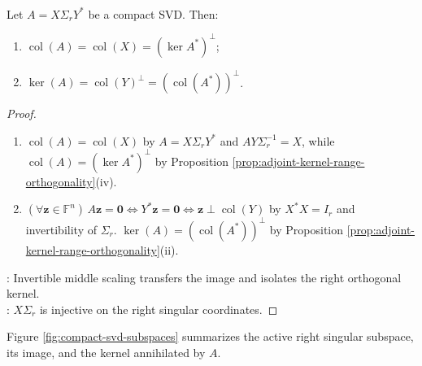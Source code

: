 \begin{theorem} \label{thm:compact-svd-subspaces} \\
Let $A=X\Sigma_rY^*$ be a compact SVD. Then:
\begin{enumerate}[label=(\roman*)]
\setlength{\itemsep}{0pt}
\item $\operatorname{col}(A)=\operatorname{col}(X)=(\ker A^*)^{\perp}$;
\item $\ker(A)=\operatorname{col}(Y)^{\perp}=(\operatorname{col}(A^*))^{\perp}$.
\end{enumerate}
\begin{proof}
\begin{enumerate}[label=(\roman*)]
\setlength{\itemsep}{0pt}
\item $\operatorname{col}(A)=\operatorname{col}(X)$ by $A=X\Sigma_rY^*$ and $AY\Sigma_r^{-1}=X$, while $\operatorname{col}(A)=(\ker A^*)^\perp$ by Proposition \ref{prop:adjoint-kernel-range-orthogonality}(iv).
\item $(\forall\mathbf{z}\in\mathbb{F}^n)\,A\mathbf{z}=\mathbf{0}\Longleftrightarrow Y^*\mathbf{z}=\mathbf{0}\Longleftrightarrow\mathbf{z}\perp\operatorname{col}(Y)$ by $X^*X=I_r$ and invertibility of $\Sigma_r$. $\ker(A)=(\operatorname{col}(A^*))^\perp$ by Proposition \ref{prop:adjoint-kernel-range-orthogonality}(ii).
\end{enumerate}
: Invertible middle scaling transfers the image and isolates the right orthogonal kernel.\\
: $X\Sigma_r$ is injective on the right singular coordinates.
\end{proof}
\end{theorem}

Figure \ref{fig:compact-svd-subspaces} summarizes the active right singular subspace, its image, and the kernel annihilated by $A$.

\begin{illustrationfigure}[H]
  \centering
  
  \caption{Compact SVD: $A$ maps $\operatorname{col}(Y)$ onto $\operatorname{col}(X)$ and kills $\ker(A)=\operatorname{col}(Y)^\perp$.}
  \label{fig:compact-svd-subspaces}
\end{illustrationfigure}

